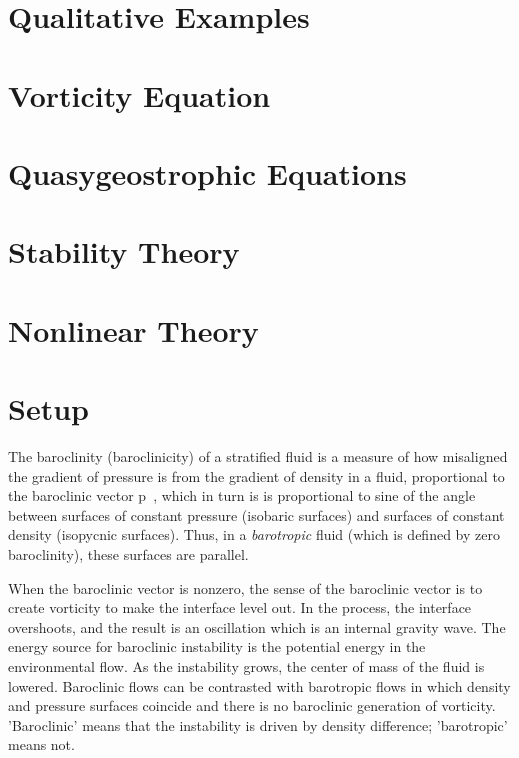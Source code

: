 \section{Qualitative Examples}
\label{s:examples}
\section{Vorticity Equation}
\label{s:vorticity}
\section{Quasygeostrophic Equations}
\label{s:qg}
\section{Stability Theory}
\label{s:stability}
\section{Nonlinear Theory}
\label{s:nonlinear}
\section{Setup}
\label{s:review}

The baroclinity (baroclinicity) of a stratified fluid is a measure of how
misaligned the gradient of pressure is from the gradient of density in a
fluid, proportional to the baroclinic vector
\beq
{} \nabla \rho \times \nabla p
\,,
which in turn is is proportional to sine of the angle between surfaces of constant
pressure (isobaric
surfaces) and surfaces of constant density (isopycnic surfaces). Thus, in a \emph{barotropic} fluid
(which is defined by zero baroclinity), these surfaces are parallel.

When the baroclinic vector is nonzero, the sense of the baroclinic vector
is to create vorticity to make the interface level out. In the process,
the interface overshoots, and the result is an oscillation which is an
internal gravity wave. The energy source for baroclinic instability is
the potential energy in the environmental flow. As the instability grows,
the center of mass of the fluid is lowered. Baroclinic flows can be
contrasted with barotropic flows in which density and pressure surfaces
coincide and there is no baroclinic generation of vorticity. 'Baroclinic'
means that the instability is driven by density difference; 'barotropic'
means not.

